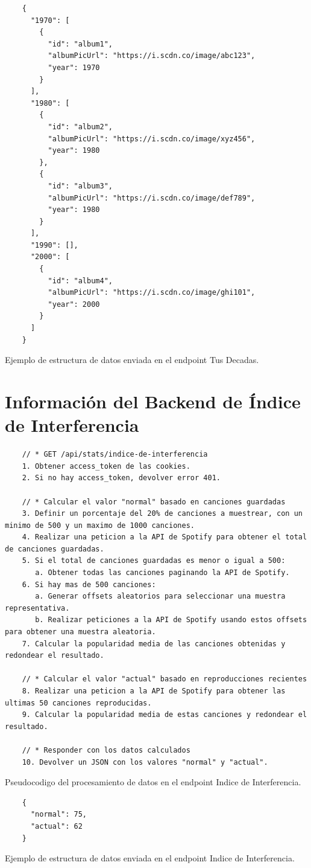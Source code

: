 \begin{ifalgorithm}[H]
  \begin{lstlisting}
    {
      "1970": [
        {
          "id": "album1",
          "albumPicUrl": "https://i.scdn.co/image/abc123",
          "year": 1970
        }
      ],
      "1980": [
        {
          "id": "album2",
          "albumPicUrl": "https://i.scdn.co/image/xyz456",
          "year": 1980
        },
        {
          "id": "album3",
          "albumPicUrl": "https://i.scdn.co/image/def789",
          "year": 1980
        }
      ],
      "1990": [],
      "2000": [
        {
          "id": "album4",
          "albumPicUrl": "https://i.scdn.co/image/ghi101",
          "year": 2000
        }
      ]
    }
    \end{lstlisting}
  \caption{Ejemplo de estructura de datos enviada en el endpoint Tus Decadas.}
  \label{alg:tus_decadas_response}
\end{ifalgorithm}

\section{Información del Backend de Índice de Interferencia} \label{sec:backend_indice_de_interferencia}

\begin{ifalgorithm}[H]
  \begin{lstlisting}
    // * GET /api/stats/indice-de-interferencia
    1. Obtener access_token de las cookies.
    2. Si no hay access_token, devolver error 401.

    // * Calcular el valor "normal" basado en canciones guardadas
    3. Definir un porcentaje del 20% de canciones a muestrear, con un minimo de 500 y un maximo de 1000 canciones.
    4. Realizar una peticion a la API de Spotify para obtener el total de canciones guardadas.
    5. Si el total de canciones guardadas es menor o igual a 500:
       a. Obtener todas las canciones paginando la API de Spotify.
    6. Si hay mas de 500 canciones:
       a. Generar offsets aleatorios para seleccionar una muestra representativa.
       b. Realizar peticiones a la API de Spotify usando estos offsets para obtener una muestra aleatoria.
    7. Calcular la popularidad media de las canciones obtenidas y redondear el resultado.

    // * Calcular el valor "actual" basado en reproducciones recientes
    8. Realizar una peticion a la API de Spotify para obtener las ultimas 50 canciones reproducidas.
    9. Calcular la popularidad media de estas canciones y redondear el resultado.

    // * Responder con los datos calculados
    10. Devolver un JSON con los valores "normal" y "actual".
    \end{lstlisting}
  \caption{Pseudocodigo del procesamiento de datos en el endpoint Indice de Interferencia.}
  \label{alg:indice_interferencia}
\end{ifalgorithm}

\begin{ifalgorithm}[H]
  \begin{lstlisting}
    {
      "normal": 75,
      "actual": 62
    }
    \end{lstlisting}
  \caption{Ejemplo de estructura de datos enviada en el endpoint Indice de Interferencia.}
  \label{alg:indice_interferencia_response}
\end{ifalgorithm}





